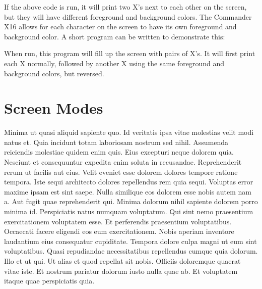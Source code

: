 
If the above code is run, it will print two X's next to each other on the
screen, but they will have different foreground and background colors.  The
Commander X16 allows for each character on the screen to have its own
foreground and background color.  A short program can be written to demonstrate
this:\\




When run, this program will fill up the screen with pairs of X's.  It will
first print each X normally, followed by another X using the same foreground
and background colors, but reversed.\\


\chapter*{Screen Modes}

Minima ut quasi aliquid sapiente quo. Id veritatis ipsa vitae molestias velit
modi natus et. Quia incidunt totam laboriosam nostrum sed nihil. Assumenda
reiciendis molestiae quidem enim quis. Eius excepturi neque dolorem quia.
Nesciunt et consequuntur expedita enim soluta in recusandae. Reprehenderit
rerum ut facilis aut eius. Velit eveniet esse dolorem dolores tempore ratione
tempora. Iste sequi architecto dolores repellendus rem quia sequi. Voluptas
error maxime ipsam est sint saepe. Nulla similique eos dolorem esse nobis autem
nam a. Aut fugit quae reprehenderit qui. Minima dolorum nihil sapiente dolorem
porro minima id. Perspiciatis natus numquam voluptatum. Qui sint nemo
praesentium exercitationem voluptatem esse. Et perferendis praesentium
voluptatibus. Occaecati facere eligendi eos eum exercitationem. Nobis aperiam
inventore laudantium eius consequatur cupiditate. Tempora dolore culpa magni ut
eum sint voluptatibus. Quasi repudiandae necessitatibus repellendus cumque quia
dolorum. Illo et ut qui. Ut alias et quod repellat sit nobis. Officiis
doloremque quaerat vitae iste. Et nostrum pariatur dolorum iusto nulla quae ab.
Et voluptatem itaque quae perspiciatis quia.

